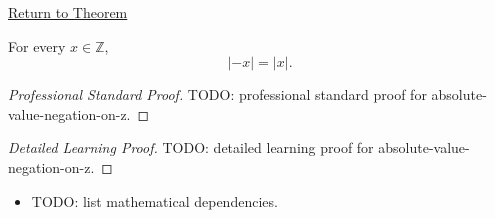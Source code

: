 \newpage
{}
\label{prf:absolute-value-negation-on-z}

\begin{remark*}[Return]
\hyperref[thm:absolute-value-negation-on-z]{Return to Theorem}
\end{remark*}

\begin{theorem*}
For every $x\in\mathbb{Z}$,
\[
|-x|=|x|.
\]
\end{theorem*}

\begin{proof}[Professional Standard Proof]
\LRAProofBodyStart
TODO: professional standard proof for absolute-value-negation-on-z.
\end{proof}

\begin{proof}[Detailed Learning Proof]
\LRAProofBodyStart
TODO: detailed learning proof for absolute-value-negation-on-z.
\end{proof}

\begin{remark*}
\end{remark*}

\begin{dependencies}
\begin{itemize}
  \item TODO: list mathematical dependencies.
\end{itemize}
\end{dependencies}

\clearpage
